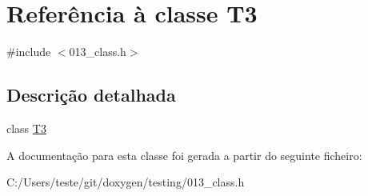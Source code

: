 \hypertarget{class_t3}{\section{Referência à classe T3}
\label{class_t3}
}


{\ttfamily \#include $<$013\-\_\-class.\-h$>$}



\subsection{Descrição detalhada}
class \hyperlink{class_t3}{T3} 

A documentação para esta classe foi gerada a partir do seguinte ficheiro\-:\begin{DoxyCompactItemize}
\item 
C\-:/\-Users/teste/git/doxygen/testing/013\-\_\-class.\-h\end{DoxyCompactItemize}
